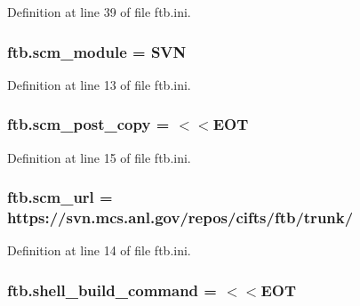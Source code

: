 Definition at line 39 of file ftb.\-ini.

\hypertarget{namespaceftb_a26a832e4479187da7d76e4b52ec65ba0}{
\subsubsection[{scm\-\_\-module}]{\setlength{\rightskip}{0pt plus 5cm}ftb.\-scm\-\_\-module = S\-V\-N}}\label{namespaceftb_a26a832e4479187da7d76e4b52ec65ba0}


Definition at line 13 of file ftb.\-ini.

\hypertarget{namespaceftb_a4d7198772f78b31a4983c1dac25046e0}{
\subsubsection[{scm\-\_\-post\-\_\-copy}]{\setlength{\rightskip}{0pt plus 5cm}ftb.\-scm\-\_\-post\-\_\-copy = $<$$<$E\-O\-T}}\label{namespaceftb_a4d7198772f78b31a4983c1dac25046e0}


Definition at line 15 of file ftb.\-ini.

\hypertarget{namespaceftb_a026e23a3b319d0b23c51013f5ef52090}{
\subsubsection[{scm\-\_\-url}]{\setlength{\rightskip}{0pt plus 5cm}ftb.\-scm\-\_\-url = https\-://svn.\-mcs.\-anl.\-gov/repos/cifts/ftb/trunk/}}\label{namespaceftb_a026e23a3b319d0b23c51013f5ef52090}


Definition at line 14 of file ftb.\-ini.

\hypertarget{namespaceftb_a52b04761ebaaf1f84781e8767994b72a}{
\subsubsection[{shell\-\_\-build\-\_\-command}]{\setlength{\rightskip}{0pt plus 5cm}ftb.\-shell\-\_\-build\-\_\-command = $<$$<$E\-O\-T}}\label{namespaceftb_a52b04761ebaaf1f84781e8767994b72a}


